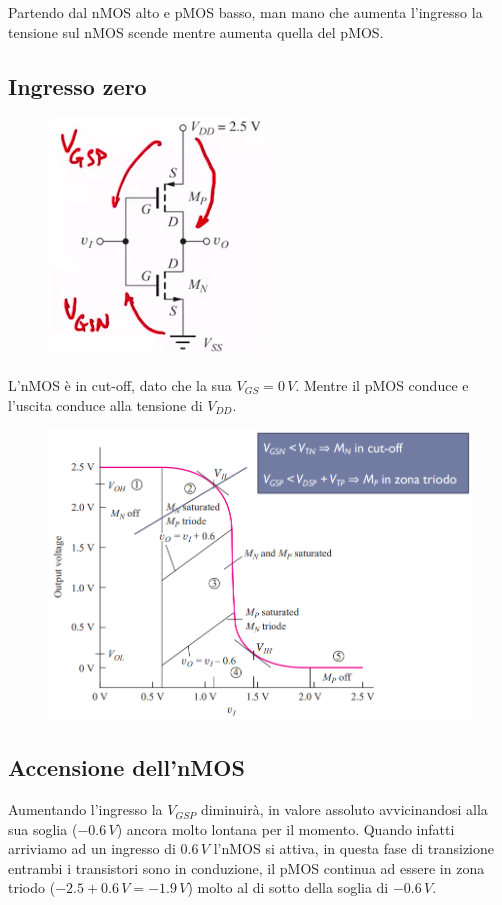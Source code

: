 Partendo dal nMOS alto e pMOS basso, man mano che aumenta l'ingresso la tensione sul nMOS scende mentre aumenta quella del pMOS.

\newpage
\subsection{Ingresso zero}

\begin{figure}[htbp]
    \centering
    \includegraphics[width=0.25\linewidth]{img/casdb.png}
    
\end{figure}

L'nMOS è in cut-off, dato che la sua $V_{GS} = 0\,V$. Mentre il pMOS conduce e l'uscita conduce alla tensione di $V_{DD}$.

\begin{figure}[htbp]
    \centering
    \includegraphics[width=0.7\linewidth]{img/zona_1.png}   
    
\end{figure}


\newpage
\subsection{Accensione dell'nMOS}

Aumentando l'ingresso la $V_{GSP}$ diminuirà, in valore assoluto avvicinandosi alla sua soglia ($-0.6\,V$) ancora molto lontana per il momento. Quando infatti arriviamo ad un ingresso di $0.6\,V$ l'nMOS si attiva, in questa fase di transizione entrambi i transistori sono in conduzione, il pMOS continua ad essere in zona triodo ($-2.5+0.6\,V = -1.9\,V$) molto al di sotto della soglia di $-0.6\,V$.


